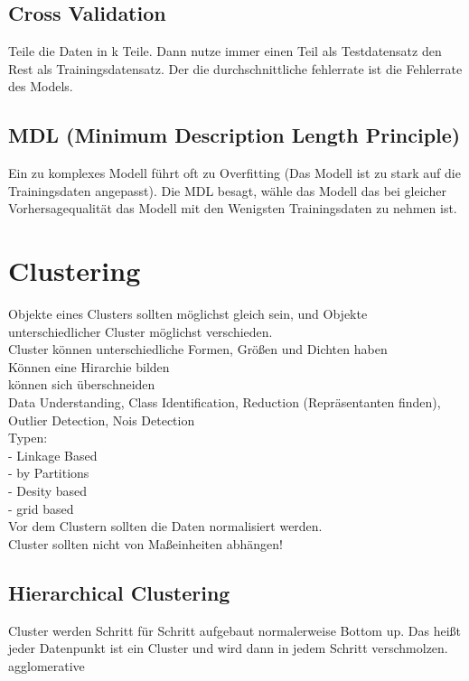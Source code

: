 \documentclass[a4paper]{scrartcl}
\begin{document}
\subsection{Cross Validation}
Teile die Daten in k Teile. Dann nutze immer einen Teil als Testdatensatz den Rest als Trainingsdatensatz.
Der die durchschnittliche fehlerrate ist die Fehlerrate des Models.\\
\subsection{MDL (Minimum Description Length Principle)}
Ein zu komplexes Modell führt oft zu Overfitting (Das Modell ist zu stark auf die Trainingsdaten angepasst). 
Die MDL besagt, wähle das Modell das bei gleicher Vorhersagequalität das Modell mit den Wenigsten Trainingsdaten zu nehmen ist.
\section{Clustering}
Objekte eines Clusters sollten möglichst gleich sein, und Objekte unterschiedlicher Cluster möglichst verschieden.\\
Cluster können unterschiedliche Formen, Größen und Dichten haben\\
Können eine Hirarchie bilden\\
können sich überschneiden\\

Data Understanding, Class Identification, Reduction (Repräsentanten finden), Outlier Detection, Nois Detection\\

Typen:\\
- Linkage Based\\
- by Partitions\\
- Desity based\\
- grid based\\

Vor dem Clustern sollten die Daten normalisiert werden.\\
Cluster sollten nicht von Maßeinheiten abhängen!\\

\subsection{Hierarchical Clustering}
Cluster werden Schritt für Schritt aufgebaut normalerweise Bottom up. Das heißt jeder Datenpunkt ist ein Cluster und wird dann in jedem Schritt verschmolzen. agglomerative\\
\end{document}
